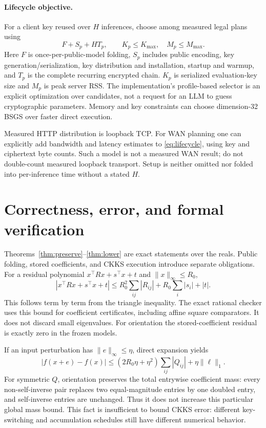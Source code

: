 \documentclass[10pt]{article}
\begin{document}
\paragraph{Lifecycle objective.}
For a client key reused over $H$ inferences, choose among measured legal plans using
\begin{equation}\label{eq:lifecycle}
F+S_p+HT_p,\qquad K_p\le K_{\max},\quad M_p\le M_{\max}.
\end{equation}
Here $F$ is once-per-public-model folding, $S_p$ includes public encoding, key generation/serialization, key distribution and installation, startup and warmup, and $T_p$ is the complete recurring encrypted chain. $K_p$ is serialized evaluation-key size and $M_p$ is peak server RSS. The implementation's profile-based selector is an explicit optimization over candidates, not a request for an LLM to guess cryptographic parameters. Memory and key constraints can choose dimension-32 BSGS over faster direct execution.

Measured HTTP distribution is loopback TCP. For WAN planning one can explicitly add bandwidth and latency estimates to \eqref{eq:lifecycle}, using key and ciphertext byte counts. Such a model is not a measured WAN result; do not double-count measured loopback transport. Setup is neither omitted nor folded into per-inference time without a stated $H$.

\section{Correctness, error, and formal verification}\label{sec:verification}
Theorems~\ref{thm:preserve}--\ref{thm:lower} are exact statements over the reals. Public folding, stored coefficients, and CKKS execution introduce separate obligations. For a residual polynomial $x^\top Rx+s^\top x+t$ and $\|x\|_\infty\le R_0$,
\begin{equation}\label{eq:residual}
|x^\top Rx+s^\top x+t|\le R_0^2\sum_{ij}|R_{ij}|+R_0\sum_i|s_i|+|t|.
\end{equation}
This follows term by term from the triangle inequality. The exact rational checker uses this bound for coefficient certificates, including affine square comparators. It does not discard small eigenvalues. For orientation the stored-coefficient residual is exactly zero in the frozen models.

If an input perturbation has $\|e\|_\infty\le\eta$, direct expansion yields
\[
|f(x+e)-f(x)|\le(2R_0\eta+\eta^2)\sum_{ij}|Q_{ij}|+\eta\|\ell\|_1.
\]
For symmetric $Q$, orientation preserves the total entrywise coefficient mass: every non-self-inverse pair replaces two equal-magnitude entries by one doubled entry, and self-inverse entries are unchanged. Thus it does not increase this particular global mass bound. This fact is insufficient to bound CKKS error: different key-switching and accumulation schedules still have different numerical behavior.
\end{document}
